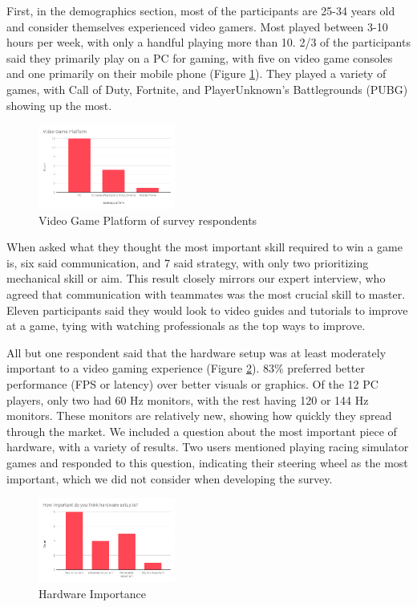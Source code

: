 \documentclass[11pt,manuscript,screen,review]{acmart} %
\begin{document}
First, in the demographics section, most of the participants are 25-34 years old and consider themselves experienced video gamers. Most played between 3-10 hours per week, with only a handful playing more than 10. 2/3 of the participants said they primarily play on a PC for gaming, with five on video game consoles and one primarily on their mobile phone (Figure \ref{fig:amt-platform}). They played a variety of games, with Call of Duty, Fortnite, and PlayerUnknown's Battlegrounds (PUBG) showing up the most.

\begin{figure}[h]
    \centering
    \includegraphics[width=0.4\textwidth]{img/amt-platform.png}
    \caption{Video Game Platform of survey respondents}
    \label{fig:amt-platform}
\end{figure}

When asked what they thought the most important skill required to win a game is, six said communication, and 7 said strategy, with only two prioritizing mechanical skill or aim. This result closely mirrors our expert interview, who agreed that communication with teammates was the most crucial skill to master. Eleven participants said they would look to video guides and tutorials to improve at a game, tying with watching professionals as the top ways to improve. 

All but one respondent said that the hardware setup was at least moderately important to a video gaming experience (Figure \ref{fig:amt-hardware}). 83\% preferred better performance (FPS or latency) over better visuals or graphics. Of the 12 PC players, only two had 60 Hz monitors, with the rest having 120 or 144 Hz monitors. These monitors are relatively new, showing how quickly they spread through the market. We included a question about the most important piece of hardware, with a variety of results. Two users mentioned playing racing simulator games and responded to this question, indicating their steering wheel as the most important, which we did not consider when developing the survey.

\begin{figure}[h]
    \centering
    \includegraphics[width=0.4\textwidth]{img/amt-hardware.png}
    \caption{Hardware Importance}
    \label{fig:amt-hardware}
\end{figure}
\end{document}
